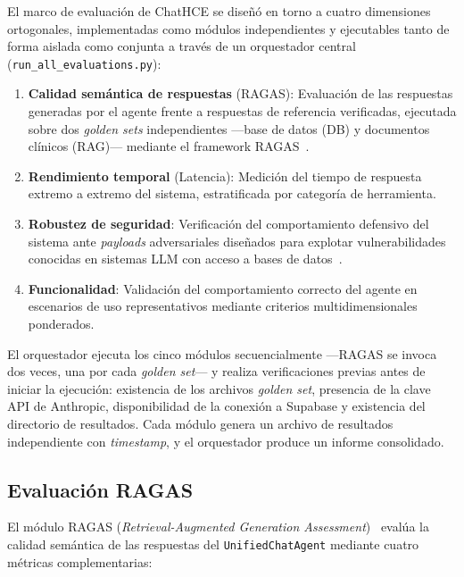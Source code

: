 El marco de evaluación de ChatHCE se diseñó en torno a cuatro dimensiones ortogonales, implementadas como módulos independientes y ejecutables tanto de forma aislada como conjunta a través de un orquestador central (\texttt{run\_all\_evaluations.py}):

\begin{enumerate}[nosep, leftmargin=*]
  \item \textbf{Calidad semántica de respuestas} (\ac{RAGAS}): Evaluación de las respuestas generadas por el agente frente a respuestas de referencia verificadas, ejecutada sobre dos \textit{golden sets} independientes ---base de datos (DB) y documentos clínicos (\ac{RAG})--- mediante el framework \ac{RAGAS}~\parencite{Es2023ragas}.
  \item \textbf{Rendimiento temporal} (Latencia): Medición del tiempo de respuesta extremo a extremo del sistema, estratificada por categoría de herramienta.
  \item \textbf{Robustez de seguridad}: Verificación del comportamiento defensivo del sistema ante \textit{payloads} adversariales diseñados para explotar vulnerabilidades conocidas en sistemas \ac{LLM} con acceso a bases de datos~\parencite{OWASP2023llm}.
  \item \textbf{Funcionalidad}: Validación del comportamiento correcto del agente en escenarios de uso representativos mediante criterios multidimensionales ponderados.
\end{enumerate}

El orquestador ejecuta los cinco módulos secuencialmente ---\ac{RAGAS} se invoca dos veces, una por cada \textit{golden set}--- y realiza verificaciones previas antes de iniciar la ejecución: existencia de los archivos \textit{golden set}, presencia de la clave \ac{API} de Anthropic, disponibilidad de la conexión a Supabase y existencia del directorio de resultados. Cada módulo genera un archivo de resultados independiente con \textit{timestamp}, y el orquestador produce un informe consolidado.


\subsection{Evaluación RAGAS}
\label{subsec:metodologia_ragas}

El módulo \ac{RAGAS} (\textit{Retrieval-Augmented Generation Assessment})~\parencite{Es2023ragas} evalúa la calidad semántica de las respuestas del \texttt{UnifiedChatAgent} mediante cuatro métricas complementarias:

